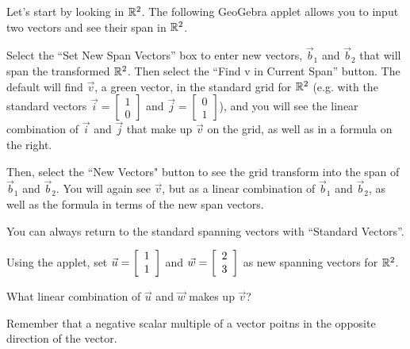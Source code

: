 \documentclass{ximera}
\begin{document}
\begin{exploration}

Let's start by looking in $\R^2$. The following GeoGebra applet allows you to input two vectors and see their span in $\R^2$. 

Select the ``Set New Span Vectors'' box to enter new vectors, $\vec{b}_1$ and $\vec{b}_2$ that will span the transformed $\RR^2$. Then select the ``Find v in Current Span'' button. The default will find $\vec{v}$, a green vector, in the standard grid for $\RR^2$ (e.g. with the standard vectors $\vec{i}=\begin{bmatrix}
  1\\0
\end{bmatrix}$ and $\vec{j}=\begin{bmatrix}
  0\\1
\end{bmatrix}$), and you will see the linear combination of $\vec{i}$ and $\vec{j}$ that make up $\vec{v}$ on the grid, as well as in a formula on the right.

\begin{center}
\end{center}

Then, select the ``New Vectors" button to see the grid transform into the span of $\vec{b}_1$ and $\vec{b}_2$. You will again see $\vec{v}$, but as a linear combination of $\vec{b}_1$ and $\vec{b}_2$, as well as the formula in terms of the new span vectors.

You can always return to the standard spanning vectors with ``Standard Vectors''.

\begin{example}

  Using the applet, set $\vect{u}=\startmat{r} 1 \\ 1 \stopmat$ and $\vec{w}=\startmat{r} 2 \\ 3 \stopmat$ as new spanning vectors for $\RR^2$.
  
  What linear combination of $\vec{u}$ and $\vec{w}$ makes up $\vec{v}$?

  \begin{hint}
  
    Remember that a negative scalar multiple of a vector poitns in the opposite direction of the vector.

  \end{hint}

  \begin{solution}
  

\end{solution}
\end{example}
\end{exploration}
\end{document}

